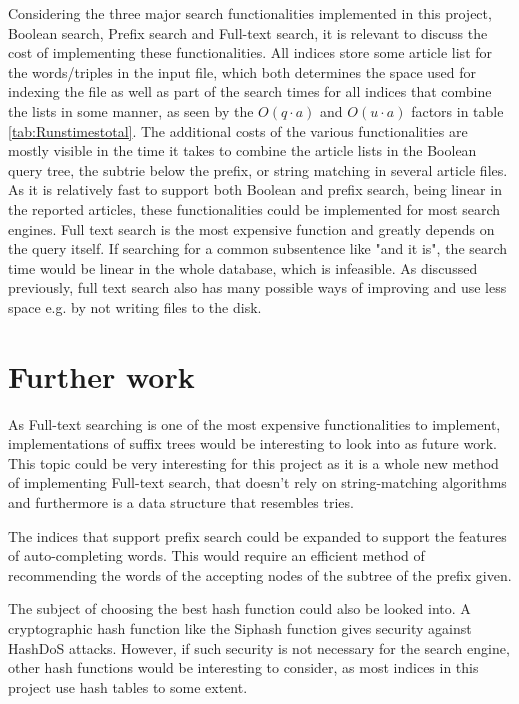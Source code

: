 Considering the three major search functionalities implemented in this project, Boolean search, Prefix search and Full-text search, it is relevant to discuss the cost of implementing these functionalities. All indices store some article list for the words/triples in the input file, which both determines the space used for indexing the file as well as part of the search times for all indices that combine the lists in some manner, as seen by the $O(q\cdot a)$ and $O(u\cdot a)$ factors in table \ref{tab:Runstimestotal}. The additional costs of the various functionalities are mostly visible in the time it takes to combine the article lists in the Boolean query tree, the subtrie below the prefix, or string matching in several article files. As it is relatively fast to support both Boolean and prefix search, being linear in the reported articles, these functionalities could be implemented for most search engines. Full text search is the most expensive function and greatly depends on the query itself. If searching for a common subsentence like "and it is", the search time would be linear in the whole database, which is infeasible. As discussed previously, full text search also has many possible ways of improving and use less space e.g. by not writing files to the disk. 

\section{Further work}

As Full-text searching is one of the most expensive functionalities to implement, implementations of suffix trees would be interesting to look into as future work. This topic could be very interesting for this project as it is a whole new method of implementing Full-text search, that doesn't rely on string-matching algorithms and furthermore is a data structure that resembles tries. 

The indices that support prefix search could be expanded to support the features of auto-completing words. This would require an efficient method of recommending the words of the accepting nodes of the subtree of the prefix given.

The subject of choosing the best hash function could also be looked into. A cryptographic hash function like the Siphash function gives security against HashDoS attacks. However, if such security is not necessary for the search engine, other hash functions would be interesting to consider, as most indices in this project use hash tables to some extent. 

